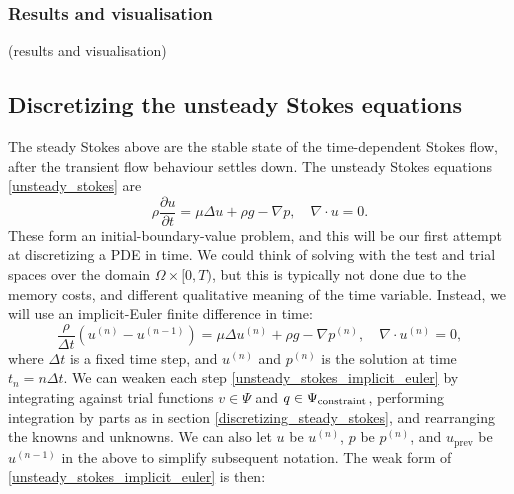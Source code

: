 \documentclass[11pt,a4paper]{memoir}
\newcommand{\om}{{\Omega}}
\newcommand{\Part}[2]{\frac{\partial #1}{\partial #2}}
\begin{document}
\subsubsection{Results and visualisation}
\vskip 0.2in
(results and visualisation)
\vskip 0.2in

\subsection{Discretizing the unsteady Stokes equations}\label{discretizing_unsteady_stokes}
The steady Stokes above are the stable state of the time-dependent Stokes flow,
after the transient flow behaviour settles down. The unsteady Stokes equations \eqref{unsteady_stokes} are
\begin{equation*}
    \rho\Part{u}{t} = \mu\Delta u + \rho g - \nabla p, \quad \nabla\cdot u = 0.
\end{equation*}
These form an initial-boundary-value problem, and this will be our first attempt at discretizing a PDE in time.
We could think of solving with the test and trial spaces over the domain $\Omega \times [0, T)$, but this is typically not done due to the memory costs,
and different qualitative meaning of the time variable. Instead, we will use an implicit-Euler finite difference in time: 
\begin{equation}\label{unsteady_stokes_implicit_euler}
    \frac{\rho}{\Delta t} \left(u^{(n)} - u^{(n-1)}\right) = \mu\Delta u^{(n)} + \rho g - \nabla p^{(n)}, \quad \nabla\cdot u^{(n)} = 0,
\end{equation}
where $\Delta t$ is a fixed time step, and $u^{(n)}$ and $p^{(n)}$ is the solution at time $t_n = n\Delta t$. We can weaken each step
\eqref{unsteady_stokes_implicit_euler}
by integrating against trial functions $v \in \Psi$ and $q \in {\Psi_{\text{constraint}}}$, performing integration by parts as in section \ref{discretizing_steady_stokes},
\newcommand{\uprev}{{u_{\text{prev}}}}
and rearranging the knowns and unknowns. We can also let $u$ be $u^{(n)}$, $p$ be $p^{(n)}$, and $\uprev$ be $u^{(n-1)}$ in the above to simplify
subsequent notation. The weak form of \eqref{unsteady_stokes_implicit_euler} is then:
\end{document}
